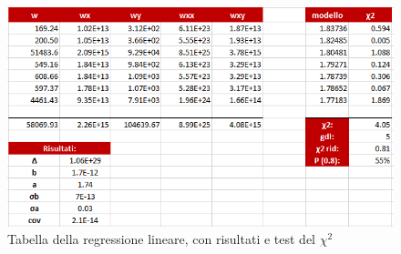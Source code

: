 \documentclass{article}
\begin{document}
\begin{figure}[h!]
  \centering
  \includegraphics[width=\linewidth]{Prisma_app}
  \caption{Tabella della regressione lineare, con risultati e test del $\chi ^2$}
\end{figure}
\end{document}
